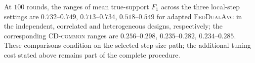 At $100$ rounds, the ranges of mean true-support $F_1$ across the three local-step settings are $0.732$--$0.749$, $0.713$--$0.734$, $0.518$--$0.549$ for adapted \textsc{FedDualAvg} in the independent, correlated and heterogeneous designs, respectively; the corresponding \textsc{CD-common} ranges are $0.256$--$0.298$, $0.235$--$0.282$, $0.234$--$0.285$. These comparisons condition on the selected step-size path; the additional tuning cost stated above remains part of the complete procedure.
